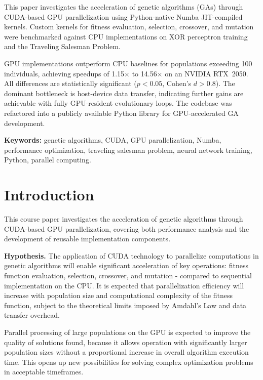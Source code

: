 \bigskip
This paper investigates the acceleration of genetic algorithms (GAs) through CUDA-based GPU parallelization using Python-native Numba JIT-compiled kernels. Custom kernels for fitness evaluation, selection, crossover, and mutation were benchmarked against CPU implementations on XOR perceptron training and the Traveling Salesman Problem.

GPU implementations outperform CPU baselines for populations exceeding 100 individuals, achieving speedups of 1.15$\times$ to 14.56$\times$ on an NVIDIA RTX~2050. All differences are statistically significant ($p < 0.05$, Cohen's $d > 0.8$). The dominant bottleneck is host-device data transfer, indicating further gains are achievable with fully GPU-resident evolutionary loops. The codebase was refactored into a publicly available Python library for GPU-accelerated GA development.

\bigskip
\textbf{Keywords:} genetic algorithms, CUDA, GPU parallelization, Numba, performance optimization, traveling salesman problem, neural network training, Python, parallel computing.

\newpage

\section{Introduction}


    \geometry{
        left=25mm,
        right=15mm,
        top=20mm,
        bottom=20mm
    }



    This course paper investigates the acceleration of genetic algorithms through CUDA-based GPU parallelization, covering both performance analysis and the development of reusable implementation components.

    \bigskip\textbf{Hypothesis.} The application of CUDA technology to parallelize computations in genetic algorithms 
    will enable significant acceleration of key operations: fitness function evaluation, 
    selection, crossover, and mutation - compared to sequential implementation on the CPU. 
    It is expected that parallelization efficiency will increase with population
    size and computational complexity of the fitness function, subject to the theoretical limits imposed by Amdahl's Law and data transfer overhead.

    \bigskip Parallel processing of large populations on the GPU is expected to improve the quality of
    solutions found, because it allows operation with significantly larger population sizes without
    a proportional increase in overall algorithm execution time. This opens up new
    possibilities for solving complex optimization problems in acceptable timeframes.

